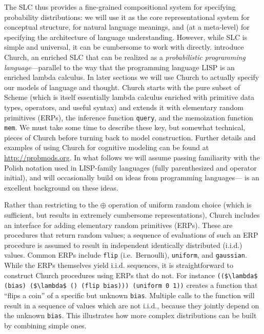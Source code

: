 \documentclass[pdfextras]{handbook}
\begin{document}
The SLC thus provides a fine-grained compositional system for specifying probability distributions: we will use it as the core representational system for conceptual structure, for natural language meanings, and (at a meta-level) for specifying the architecture of language understanding. 
However, while SLC is simple and universal, it can be cumbersome to work with directly. 
\citet{goodman08} introduce Church, an enriched SLC that can be realized as a \emph{probabilistic programming language}---parallel to the way that the programming language LISP is an enriched lambda calculus. 
In later sections we will use Church to actually specify our models of language and thought.
Church starts with the pure subset of Scheme (which is itself essentially lambda calculus enriched with primitive data types, operators, and useful syntax) and extends it with elementary random primitives (ERPs), the inference function \lstinline{query}, and the memoization function \lstinline{mem}. 
We must take some time to describe these key, but somewhat technical, pieces of Church before turning back to model construction.
Further details and examples of using Church for cognitive modeling can be found at \url{http://probmods.org}.
In what follows we will assume passing familiarity with the Polish notation used in LISP-family languages (fully parenthesized and operator initial), and will occasionally build on ideas from programming languages---\cite{abelson1983structure} is an excellent background on these ideas. 

Rather than restricting to the $\oplus$ operation of uniform random choice (which is sufficient, but results in extremely cumbersome representations), Church includes an interface for adding elementary random primitives (ERPs). 
These are procedures that return random values; a sequence of evaluations of such an ERP procedure is assumed to result in independent identically distributed (i.i.d.) values. 
Common ERPs include \lstinline{flip} (i.e.~Bernoulli), \lstinline{uniform}, and \lstinline{gaussian}. 
While the ERPs themselves yield i.i.d. sequences, it is straightforward to construct Church procedures using ERPs that do not.
For instance \lstinline[mathescape]{(($\lambda$ (bias) ($\lambda$ () (flip bias))) (uniform 0 1))} creates a function that ``flips a coin'' of a specific but unknown \lstinline{bias}.
Multiple calls to the function will result in a sequence of values which are not i.i.d., because they jointly depend on the unknown \lstinline{bias}.
This illustrates how more complex distributions can be built by combining simple ones.
\end{document}
